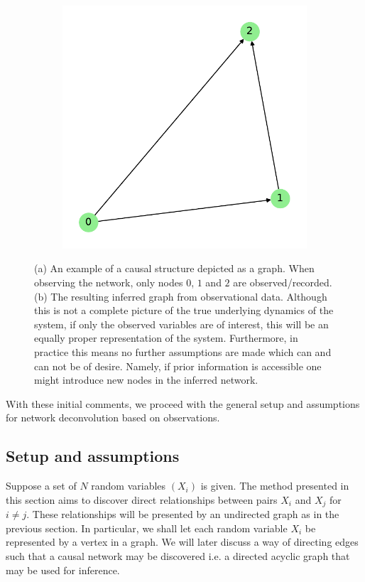 \documentclass[../Thesis.tex]{subfiles}
\begin{document}
\begin{figure}[h]
\begin{subfigure}[t]{0.49\textwidth}
        \includegraphics[width=\linewidth]{figures/ND examples/Hidden nodes/graph example wo hidden.pdf}
        \caption{}
        \label{subfig:hidden nodes example resulting graph}
    \end{subfigure}
    \caption{(a) An example of a causal structure depicted as a graph. When observing the network, only nodes $0$, $1$ and $2$ are observed/recorded. (b) The resulting inferred graph from observational data. Although this is not a complete picture of the true underlying dynamics of the system, if only the observed variables are of interest, this will be an equally proper representation of the system. Furthermore, in practice this means no further assumptions are made which can and can not be of desire. Namely, if prior information is accessible one might introduce new nodes in the inferred network.}
    \label{fig:hidden nodes example}
\end{figure}
With these initial comments, we proceed with the general setup and assumptions for network deconvolution based on observations.

\subsection{Setup and assumptions}
Suppose a set of $N$ random variables $(X_i)$ is given. The method presented in this section aims to discover direct relationships between pairs $X_i$ and $X_j$ for $i\neq j$. These relationships will be presented by an undirected graph as in the previous section. In particular, we shall let each random variable $X_i$ be represented by a vertex in a graph. We will later discuss a way of directing edges such that a causal network may be discovered i.e. a directed acyclic graph that may be used for inference.
\end{document}
